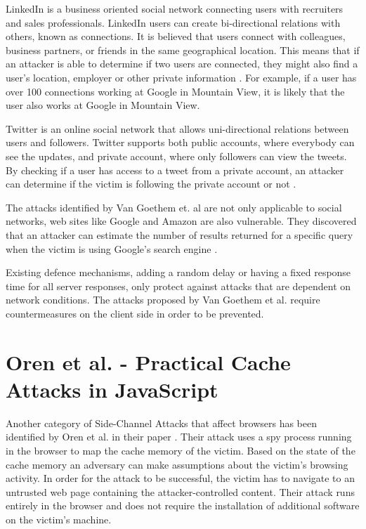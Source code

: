 \documentclass[10pt,a4paper,twoside]{book}
\begin{document}
LinkedIn is a business oriented social network connecting users with recruiters and sales professionals. LinkedIn users can create bi-directional relations with others, known as connections. It is believed that users connect with colleagues, business partners, or friends in the same geographical location. This means that if an attacker is able to determine if two users are connected, they might also find a user's location, employer or other private information \cite{van2015clock}. For example, if a user has over 100 connections working at Google in Mountain View, it is likely that the user also works at Google in Mountain View.

Twitter is an online social network that allows uni-directional relations between users and followers. Twitter supports both public accounts, where everybody can see the updates, and private account, where only followers can view the tweets. By checking if a user has access to a tweet from a private account, an attacker can determine if the victim is following the private account or not \cite{van2015clock}.

The attacks identified by Van Goethem et. al are not only applicable to social networks, web sites like Google and Amazon are also vulnerable. They discovered that an attacker can estimate the number of results returned for a specific query when the victim is using Google's search engine \cite{van2015clock}. 

Existing defence mechanisms, adding a random delay or having a fixed response time for all server responses, only protect against attacks that are dependent on network conditions. The attacks proposed by Van Goethem et al. require countermeasures on the client side in order to be prevented.




\section{Oren et al. - Practical Cache Attacks in JavaScript}
\label{orenetal}

Another category of Side-Channel Attacks that affect browsers has been identified by Oren et al. in their paper \cite{oren2015spy}. Their attack uses a spy process running in the browser to map the cache memory of the victim. Based on the state of the cache memory an adversary can make assumptions about the victim's browsing activity. In order for the attack to be successful, the victim has to navigate to an untrusted web page containing the attacker-controlled content. Their attack runs entirely in the browser and does not require the installation of additional software on the victim's machine.
\end{document}
